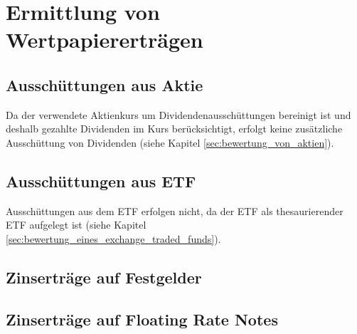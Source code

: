 \documentclass[12pt, a4paper]{article}
\begin{document}

\section{Ermittlung von Wertpapiererträgen}
\label{sec:ermittlung_von_wertpapierertraegen}

\subsection{Ausschüttungen aus Aktie}
\label{sec:ausschuettung_aus_aktie}
Da der verwendete Aktienkurs um Dividendenausschüttungen bereinigt ist und deshalb gezahlte Dividenden im Kurs berücksichtigt, erfolgt keine zusätzliche Ausschüttung von Dividenden (siehe Kapitel \ref{sec:bewertung_von_aktien}).

\subsection{Ausschüttungen aus ETF}
\label{sec:ausschuettungen_aus_etf}
Ausschüttungen aus dem ETF erfolgen nicht, da der {ETF} als thesaurierender {ETF} aufgelegt ist (siehe Kapitel \ref{sec:bewertung_eines_exchange_traded_funds}).

\subsection{Zinserträge auf Festgelder}
\label{sec:zinsertraege_auf_festgelder}



\subsection{Zinserträge auf Floating Rate Notes}
\label{sec:zinsertraege_auf_floating_rate_notes}

\printbibliography[title={Literatur}]
\end{document}
